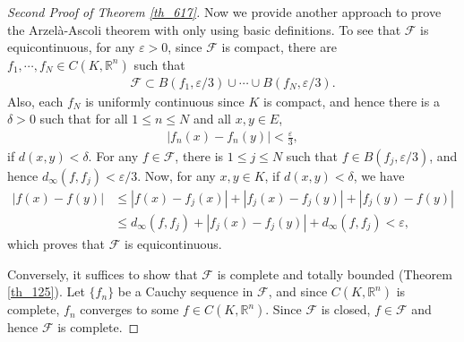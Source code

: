\documentclass[11pt]{book}
\theoremstyle{definition}
\numberwithin{equation}{chapter}
\begin{document}
\medskip

\begin{proof}[Second Proof of Theorem \ref{th_617}]\cite{4}
Now we provide another approach to prove the Arzelà-Ascoli theorem with only using basic definitions. To see that $\mathcal{F}$ is equicontinuous, for any $\varepsilon > 0$, since $\mathcal{F}$ is compact, there are $f_1, \cdots, f_N \in C(K,\mathbb{R}^n)$ such that
\begin{align*}
    \mathcal{F} \subset B(f_1,\varepsilon/3) \cup \cdots \cup B(f_N,\varepsilon/3).
\end{align*}
Also, each $f_N$ is uniformly continuous since $K$ is compact, and hence there is a $\delta > 0$ such that for all $1 \leq n \leq N$ and all $x, y \in E$, 
\begin{align*}
    \left|f_n(x) - f_n(y)\right| < \frac{\varepsilon}{3},
\end{align*}
if $d(x,y) < \delta$. For any $f \in \mathcal{F}$, there is $1 \leq j \leq N$ such that $f \in B(f_j,\varepsilon/3)$, and hence $d_\infty(f,f_j) < \varepsilon/3$. Now, for any $x, y \in K$, if $d(x,y) < \delta$, we have
\begin{align*}
    \left|f(x) - f(y)\right| & \leq \left|f(x) - f_j(x)\right| + \left|f_j(x) - f_j(y)\right| + \left|f_j(y) - f(y)\right| \\
    & \leq d_\infty(f,f_j) + \left|f_j(x) - f_j(y)\right| + d_\infty(f,f_j) < \varepsilon,
\end{align*}
which proves that $\mathcal{F}$ is equicontinuous.

Conversely, it suffices to show that $\mathcal{F}$ is complete and totally bounded (Theorem \ref{th_125}). Let $\{f_n\}$ be a Cauchy sequence in $\mathcal{F}$, and since $C(K,\mathbb{R}^n)$ is complete, $f_n$ converges to some $f \in C(K,\mathbb{R}^n)$. Since $\mathcal{F}$ is closed, $f \in \mathcal{F}$ and hence $\mathcal{F}$ is complete.


\end{proof}
\end{document}
